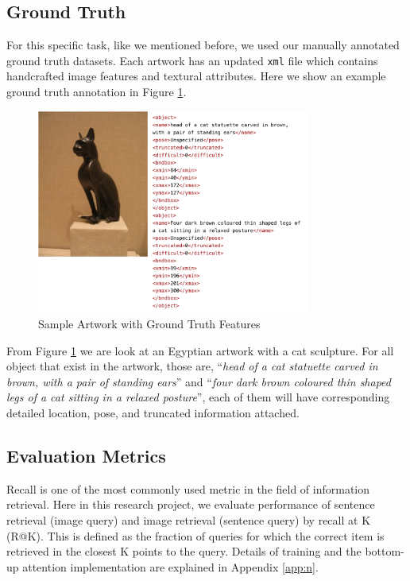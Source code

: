\subsection{Ground Truth}

For this specific task, like we mentioned before, we used our manually annotated ground truth datasets. Each artwork has an updated \verb|xml| file which contains handcrafted image features and textural attributes. Here we show an example ground truth annotation in Figure \ref{fig:sampledata}.

\begin{figure}[h!]
\centering
\includegraphics[width=0.8\textwidth]{sampledata.pdf}
\caption{Sample Artwork with Ground Truth Features}
\label{fig:sampledata}
\end{figure}

From Figure \ref{fig:sampledata} we are look at an Egyptian artwork with a cat sculpture. For all object that exist in the artwork, those are, ``\textit{head of a	cat statuette carved in	brown, with	a pair of standing ears}'' and ``\textit{four dark brown coloured thin shaped legs of a cat sitting in a relaxed posture}'', each of them will have corresponding detailed location, pose, and truncated information attached. 

\subsection{Evaluation Metrics}

Recall is one of the most commonly used metric in the field of information retrieval. Here in this research project, we evaluate performance of sentence retrieval (image query) and image retrieval (sentence query) by recall at K (R@K). This is defined as the fraction of queries for which the correct item is retrieved in the closest K points to the query. Details of training and the bottom-up attention implementation are explained in Appendix \ref{app:n}.

